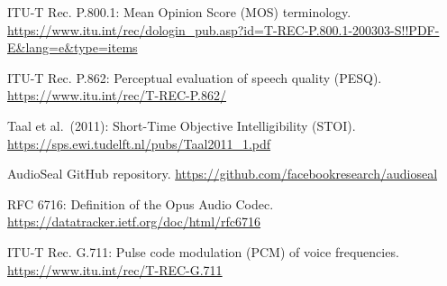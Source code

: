 \noindent [70] ITU-T Rec. P.800.1: Mean Opinion Score (MOS) terminology. \url{https://www.itu.int/rec/dologin_pub.asp?id=T-REC-P.800.1-200303-S!!PDF-E&lang=e&type=items}\par
\noindent [71] ITU-T Rec. P.862: Perceptual evaluation of speech quality (PESQ). \url{https://www.itu.int/rec/T-REC-P.862/}\par
\noindent [72] Taal et al.\ (2011): Short-Time Objective Intelligibility (STOI). \url{https://sps.ewi.tudelft.nl/pubs/Taal2011_1.pdf}\par
\noindent [73] AudioSeal GitHub repository. \url{https://github.com/facebookresearch/audioseal}\par
\noindent [74] RFC 6716: Definition of the Opus Audio Codec. \url{https://datatracker.ietf.org/doc/html/rfc6716}\par
\noindent [75] ITU-T Rec. G.711: Pulse code modulation (PCM) of voice frequencies. \url{https://www.itu.int/rec/T-REC-G.711}\par
